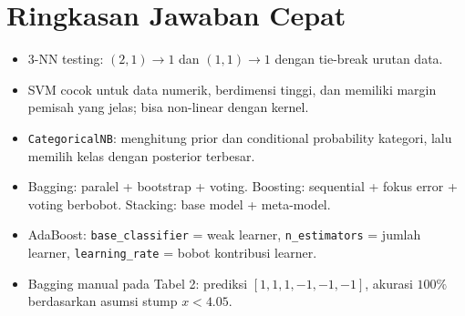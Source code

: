 \documentclass[a4paper,10pt,twocolumn]{article}
\begin{document}
\section*{Ringkasan Jawaban Cepat}
\begin{itemize}
    \item 3-NN testing: $(2,1)\rightarrow 1$ dan $(1,1)\rightarrow 1$ dengan tie-break urutan data.
    \item SVM cocok untuk data numerik, berdimensi tinggi, dan memiliki margin pemisah yang jelas; bisa non-linear dengan kernel.
    \item \texttt{CategoricalNB}: menghitung prior dan conditional probability kategori, lalu memilih kelas dengan posterior terbesar.
    \item Bagging: paralel + bootstrap + voting. Boosting: sequential + fokus error + voting berbobot. Stacking: base model + meta-model.
    \item AdaBoost: \texttt{base\_classifier} = weak learner, \texttt{n\_estimators} = jumlah learner, \texttt{learning\_rate} = bobot kontribusi learner.
    \item Bagging manual pada Tabel 2: prediksi $[1,1,1,-1,-1,-1]$, akurasi $100\%$ berdasarkan asumsi stump $x<4.05$.
\end{itemize}
\end{document}
